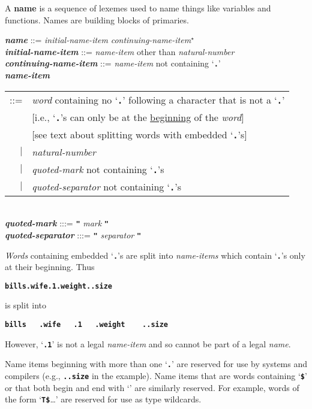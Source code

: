 \documentclass[12pt]{article}
\newcommand{\TT}[1]{{\tt \bfseries #1}}
\newcommand{\STAR}{{\Large $^\star$}}
\newcommand{\key}[1]{{\rm \bfseries #1}}
\newcommand{\emkey}[1]{{\em \bfseries #1}}
\newenvironment{indpar}[1][0.3in]%
	{\begin{list}{}%
		     {\setlength{\itemsep}{0in}%
		      \setlength{\topsep}{0in}%
		      \setlength{\parsep}{1ex}%
		      \setlength{\labelwidth}{#1}%
		      \setlength{\leftmargin}{#1}%
		      \addtolength{\leftmargin}{\labelsep}}%
	 \item}%
	{\end{list}}
\begin{document}
A \key{name} is a sequence of lexemes used to name things like
variables and functions.  Names are building blocks of primaries.

\begin{indpar}
\emkey{name}\label{NAME} ::=
    {\em initial-name-item} {\em continuing-name-item}\STAR{} \\
\emkey{initial-name-item} ::= {\em name-item} other than {\em natural-number} \\
\emkey{continuing-name-item} ::= {\em name-item} not containing `\TT{.}' \\
\emkey{name-item}\label{NAME-ITEM}
    \begin{tabular}[t]{@{}rl}
    ::= & {\em word} containing no `\TT{.}' following a character
                     that is not a `\TT{.}' \\
        & [i.e., `\TT{.}'s can only be at the \underline{beginning}
	   of the {\em word}] \\
        & [see text about splitting words with embedded `\TT{.}'s] \\
    $|$ & {\em natural-number} \\
    $|$ & {\em quoted-mark} not containing `\TT{.}'s \\
    $|$ & {\em quoted-separator} not containing `\TT{.}'s \\
    \end{tabular} \\
\emkey{quoted-mark} :::= \TT{"} {\em mark} \TT{"} \\
\emkey{quoted-separator} :::= \TT{"} {\em separator} \TT{"}
\end{indpar}

{\em Words} containing embedded `\TT{.}'s are split into
{\em name-items} which contain `\TT{.}'s only at their beginning.
Thus
\begin{center}
\TT{bills.wife.1.weight..size}
\end{center}
is split into
\begin{center}
\TT{bills~~~.wife~~~.1~~~.weight~~~~..size}
\end{center}
However, `\TT{.1}' is not a legal {\em name-item} and so cannot
be part of a legal {\em name}.

Name items beginning with more than one `\TT{.}' are reserved
for use by systems and compilers (e.g., \TT{..size} in the example).
Name items that are words containing `\TT{\$}' or that both
begin and end with `\TT{*}' are
similarly reserved.  For example, words of the form `\TT{T\$}\ldots'
are reserved for use as type wildcards.
\end{document}

